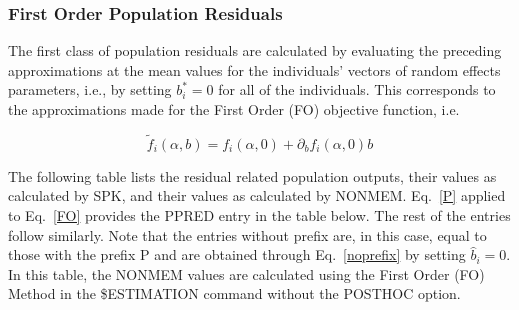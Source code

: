 \documentclass{article}
\begin{document}
\subsubsection{First Order Population Residuals}

The first class of population residuals are calculated by evaluating the
preceding approximations at the mean values for the individuals'
vectors of random effects parameters, i.e., 
by setting $b^{\ast}_i = 0$ for all of the individuals.
This corresponds to the approximations made for the First Order (FO)
objective function, i.e. 

\begin{equation} \label{FO} \tilde{f}_i(\alpha, b) = f_i(\alpha, 0)+
\partial_b f_i(\alpha, 0)b \end{equation}

The following table lists the residual related population outputs, their
values as calculated by SPK, and their values as calculated by NONMEM.
Eq.~\ref{P} applied to Eq.~\ref{FO} provides the PPRED entry in the table
below. The rest of the entries follow similarly. Note that the entries
without prefix are, in this case, equal to those with the prefix P and 
are obtained through Eq.~\ref{noprefix} by setting $\hat{b}_i=0$.
In this table, the NONMEM values are calculated using 
the First Order (FO) Method in the \$ESTIMATION command without 
the POSTHOC option.
\end{document}
